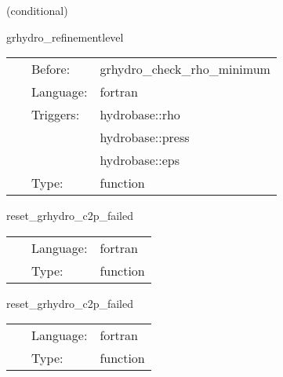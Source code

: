 \vspace{5mm}

   (conditional) 

\hspace{5mm} grhydro\_refinementlevel 

\hspace{5mm}{\it calculate current refinement level } 


\hspace{5mm}

 \begin{tabular*}{160mm}{cll} 
~ & Before:  & grhydro\_check\_rho\_minimum \\ 
~ & Language:  & fortran \\ 
~ & Triggers:  & hydrobase::rho \\ 
~& ~ &hydrobase::press\\ 
~& ~ &hydrobase::eps\\ 
~ & Type:  & function \\ 
\end{tabular*} 


\vspace{5mm}


\hspace{5mm} reset\_grhydro\_c2p\_failed 

\hspace{5mm}{\it initialise the mask function that contains the points where c2p has failed (at basegrid) } 


\hspace{5mm}

 \begin{tabular*}{160mm}{cll} 
~ & Language:  & fortran \\ 
~ & Type:  & function \\ 
\end{tabular*} 


\vspace{5mm}


\hspace{5mm} reset\_grhydro\_c2p\_failed 

\hspace{5mm}{\it reset the mask function that contains the points where c2p has failed (at prestep) } 


\hspace{5mm}

 \begin{tabular*}{160mm}{cll} 
~ & Language:  & fortran \\ 
~ & Type:  & function \\ 
\end{tabular*} 


